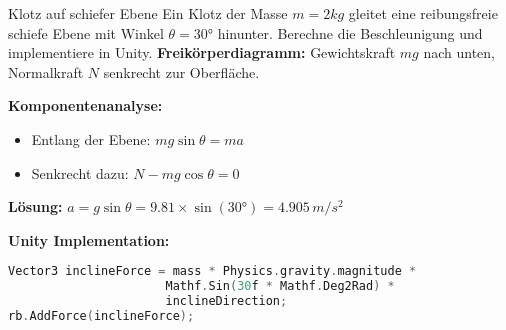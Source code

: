 \begin{example2}{Klotz auf schiefer Ebene}
    Ein Klotz der Masse $m = 2kg$ gleitet eine reibungsfreie schiefe Ebene mit Winkel $\theta = 30°$ hinunter. Berechne die Beschleunigung und implementiere in Unity.
    \tcblower
    \textbf{Freikörperdiagramm:} Gewichtskraft $mg$ nach unten, Normalkraft $N$ senkrecht zur Oberfläche.
    
    \textbf{Komponentenanalyse:}
    \begin{itemize}
        \item Entlang der Ebene: $mg\sin\theta = ma$
        \item Senkrecht dazu: $N - mg\cos\theta = 0$
    \end{itemize}
    
    \textbf{Lösung:} $a = g\sin\theta = 9.81 \times \sin(30°) = 4.905 \, m/s^2$
    
    \textbf{Unity Implementation:}
\begin{lstlisting}[language=C, style=basesmol]
Vector3 inclineForce = mass * Physics.gravity.magnitude * 
                      Mathf.Sin(30f * Mathf.Deg2Rad) * 
                      inclineDirection;
rb.AddForce(inclineForce);
\end{lstlisting}
\end{example2}